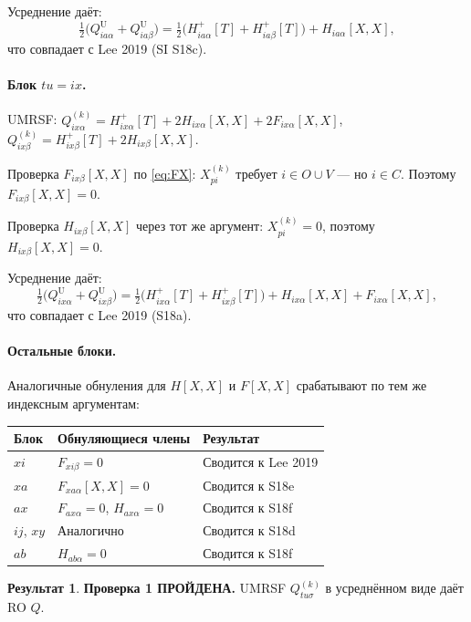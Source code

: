 \documentclass[11pt, a4paper]{article}
\theoremstyle{definition}
\newtheorem*{result}{Результат}
\newcommand{\Xk}[2]{X^{(#1)}_{#2}}
\newcommand{\Hp}{H^{+}}
\begin{document}
Усреднение даёт:
$$
\tfrac{1}{2}\bigl( Q^{\text{U}}_{ia\alpha} + Q^{\text{U}}_{ia\beta} \bigr) = \tfrac{1}{2}\bigl( \Hp_{ia\alpha}[T] + \Hp_{ia\beta}[T] \bigr) + H_{ia\alpha}[X, X],
$$
что совпадает с Lee 2019 (SI S18c). \checkmark

\paragraph{Блок $tu = ix$.}

UMRSF: $Q^{(k)}_{ix\alpha} = \Hp_{ix\alpha}[T] + 2 H_{ix\alpha}[X, X] + 2 F_{ix\alpha}[X, X]$, $Q^{(k)}_{ix\beta} = \Hp_{ix\beta}[T] + 2 H_{ix\beta}[X, X]$.

Проверка $F_{ix\beta}[X, X]$ по \eqref{eq:FX}: $\Xk{k}{pi}$ требует $i \in O \cup V$ --- но $i \in C$. Поэтому $F_{ix\beta}[X, X] = 0$.

Проверка $H_{ix\beta}[X, X]$ через тот же аргумент: $\Xk{k}{pi} = 0$, поэтому $H_{ix\beta}[X, X] = 0$.

Усреднение даёт:
$$
\tfrac{1}{2}\bigl( Q^{\text{U}}_{ix\alpha} + Q^{\text{U}}_{ix\beta} \bigr) = \tfrac{1}{2}\bigl( \Hp_{ix\alpha}[T] + \Hp_{ix\beta}[T] \bigr) + H_{ix\alpha}[X, X] + F_{ix\alpha}[X, X],
$$
что совпадает с Lee 2019 (S18a). \checkmark

\paragraph{Остальные блоки.}

Аналогичные обнуления для $H[X, X]$ и $F[X, X]$ срабатывают по тем же индексным аргументам:

\begin{center}
\begin{tabular}{lll}
\toprule
Блок & Обнуляющиеся члены & Результат \\
\midrule
$xi$ & $F_{xi\beta} = 0$ & Сводится к Lee 2019 \\
$xa$ & $F_{xa\alpha}[X, X] = 0$ & Сводится к S18e \\
$ax$ & $F_{ax\alpha} = 0$, $H_{ax\alpha} = 0$ & Сводится к S18f \\
$ij$, $xy$ & Аналогично & Сводится к S18d \\
$ab$ & $H_{ab\alpha} = 0$ & Сводится к S18f \\
\bottomrule
\end{tabular}
\end{center}

\begin{result}
\textbf{Проверка 1 ПРОЙДЕНА.} UMRSF $Q^{(k)}_{tu\sigma}$ в усреднённом виде даёт RO $Q$.
\end{result}
\end{document}
